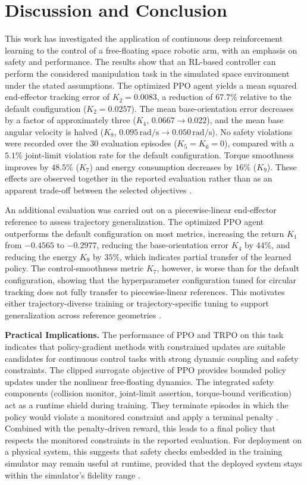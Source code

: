 \documentclass{ieeeaccess}
\begin{document}
\section{Discussion and Conclusion}
This work has investigated the application of continuous deep reinforcement learning to the control
of a free-floating space robotic arm, with an emphasis on safety and performance. The
results show that an RL-based controller can perform the considered manipulation task in the
simulated space environment under the stated assumptions. The optimized PPO agent yields a mean
squared end-effector tracking error of $K_2 = 0.0083$, a reduction of $67.7\%$ relative to
the default configuration ($K_2 = 0.0257$). The mean base-orientation error decreases by a factor
of approximately three ($K_4$, $0.0667 \to 0.022$), and the mean base angular velocity is
halved ($K_8$, $0.095\,\mathrm{rad/s} \to 0.050\,\mathrm{rad/s}$). No safety violations were recorded over the 30 evaluation
episodes ($K_5 = K_6 = 0$), compared with a $5.1\%$ joint-limit violation rate for
the default configuration. Torque smoothness improves by $48.5\%$ ($K_7$) and energy consumption decreases by
$16\%$ ($K_9$). These effects are observed together in the reported evaluation rather than as
an apparent trade-off between the selected objectives \cite{b1,b7}.

An additional evaluation was carried out on a piecewise-linear end-effector reference to assess trajectory
generalization. The optimized PPO agent outperforms the default configuration on most metrics, increasing the
return $K_1$ from $-0.4565$ to $-0.2977$, reducing the base-orientation error $K_4$ by $44\%$, and
reducing the energy $K_9$ by $35\%$, which indicates partial transfer of the learned policy.
The control-smoothness metric $K_7$, however, is worse than for the default configuration, showing that
the hyperparameter configuration tuned for circular tracking does not fully transfer to piecewise-linear references.
This motivates either trajectory-diverse training or trajectory-specific tuning to support generalization across reference geometries
\cite{b8}.

\textbf{Practical Implications.} The performance of PPO and TRPO on this task indicates that policy-gradient
methods with constrained updates are suitable candidates for continuous control tasks with strong dynamic
coupling and safety constraints. The clipped surrogate objective of PPO provides bounded policy updates
under the nonlinear free-floating dynamics. The integrated safety components (collision monitor, joint-limit assertion, torque-bound
verification) act as a runtime shield during training. They terminate episodes in which the
policy would violate a monitored constraint and apply a terminal penalty \cite{b15,b23,b22}. Combined with
the penalty-driven reward, this leads to a final policy that respects the monitored constraints
in the reported evaluation. For deployment on a physical system, this suggests that safety
checks embedded in the training simulator may remain useful at runtime, provided that the
deployed system stays within the simulator's fidelity range \cite{b22,b24}.
\end{document}

